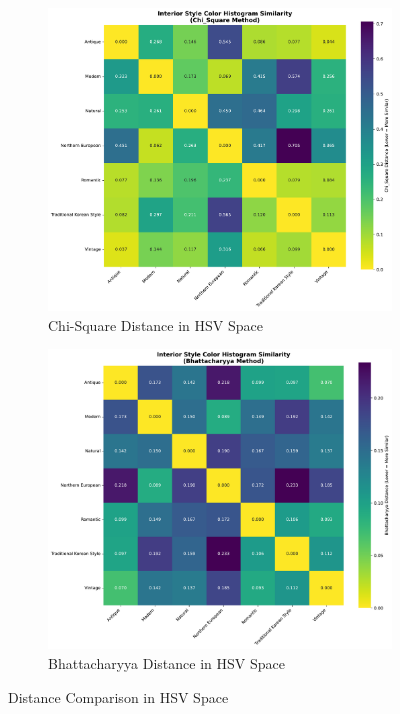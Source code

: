 \documentclass[11pt]{article}
\begin{document}
\begin{figure}[htbp]
    \centering
    \begin{subfigure}[b]{0.45\textwidth}
        \centering
        \includegraphics[width=\textwidth]{figures/hsv_chi_square_distance.pdf}
        \caption{Chi-Square Distance in HSV Space}
        \label{fig:hsv_chi_square_distance}
    \end{subfigure}
    \begin{subfigure}[b]{0.45\textwidth}
        \centering
        \includegraphics[width=\textwidth]{figures/hsv_bhattacharyya_distance.pdf}
        \caption{Bhattacharyya Distance in HSV Space}
        \label{fig:hsv_bhattacharyya_distance}
    \end{subfigure}
    \caption{Distance Comparison in HSV Space}
    \label{fig:hsv_distance_comparison}
\end{figure}
\end{document}
